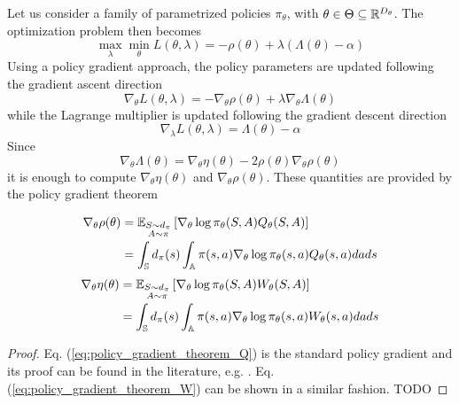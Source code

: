 Let us consider a family of parametrized policies $\pi_\theta$, with $\theta
\in \Theta \subseteq \R^{D_\theta}$. The optimization problem then becomes
\begin{equation}
	\max_\lambda \min_\theta L(\theta, \lambda) = - \rho(\theta) + \lambda
	(\Lambda(\theta) - \alpha)
\end{equation}
Using a policy gradient approach, the policy parameters are updated following 
the gradient ascent direction
\begin{equation}
	\nabla_\theta L(\theta, \lambda) = - \nabla_\theta \rho(\theta) + \lambda
	\nabla_\theta \Lambda(\theta)
\end{equation}
while the Lagrange multiplier is updated following the gradient descent
direction  
\begin{equation}
	\nabla_\lambda L(\theta, \lambda) = \Lambda(\theta) - \alpha
\end{equation}
Since 
\begin{equation}
	\nabla_\theta \Lambda(\theta) = \nabla_\theta \eta(\theta) - 2 \rho(\theta)
	\nabla_\theta \rho(\theta)
\end{equation}
it is enough to compute $\nabla_\theta \eta(\theta)$ and $\nabla_\theta
\rho(\theta)$. These quantities are provided by the policy gradient theorem 
\begin{theorem}
	\begin{equation}\label{eq:policy_gradient_theorem_Q}
		\begin{split}
			\nabla_\theta \rho(\theta) &= \E[\substack{S\sim d_\pi \\ 
			A \sim \pi}]{\nabla_\theta \log \pi_\theta(S,A) Q_\theta(S,A)}\\
			&= \int_\S d_\pi(s) \int_\A \pi(s,a) \nabla_\theta \log
			\pi_\theta(s,a) Q_\theta(s,a) da ds	
		\end{split}
	\end{equation}
	\begin{equation}\label{eq:policy_gradient_theorem_W}
		\begin{split}
			\nabla_\theta \eta(\theta) &= \E[\substack{S\sim d_\pi \\ 
			A \sim \pi}]{\nabla_\theta \log \pi_\theta(S,A) W_\theta(S,A)}\\
			&= \int_\S d_\pi(s) \int_\A \pi(s,a) \nabla_\theta \log
			\pi_\theta(s,a) W_\theta(s,a) da ds	
		\end{split}
	\end{equation}
\end{theorem}
\begin{proof}
	Eq. (\ref{eq:policy_gradient_theorem_Q}) is the standard policy gradient
	and its proof can be found in the literature, e.g. \cite{sutton1999policy}.
	Eq. (\ref{eq:policy_gradient_theorem_W}) can be shown in a similar fashion.
	TODO
\end{proof}
